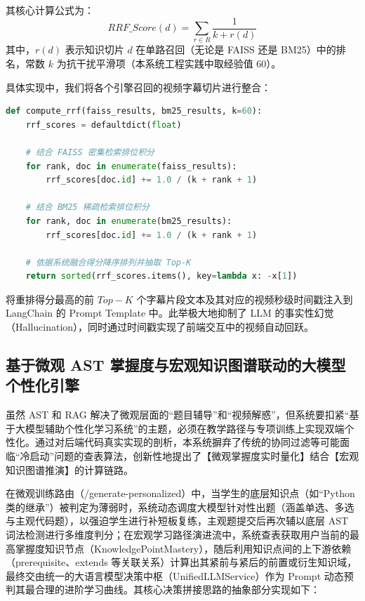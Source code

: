 其核心计算公式为：
\begin{equation}
RRF\_Score(d) = \sum_{r \in R} \frac{1}{k + r(d)}
\end{equation}
其中，$r(d)$ 表示知识切片 $d$ 在单路召回（无论是 FAISS 还是 BM25）中的排名，常数 $k$ 为抗干扰平滑项（本系统工程实践中取经验值 60）。

具体实现中，我们将各个引擎召回的视频字幕切片进行整合：
\begin{lstlisting}[language=Python, caption=双路混合 RRF 重排融合算法核心实现]
def compute_rrf(faiss_results, bm25_results, k=60):
    rrf_scores = defaultdict(float)
    
    # 结合 FAISS 密集检索排位积分
    for rank, doc in enumerate(faiss_results):
        rrf_scores[doc.id] += 1.0 / (k + rank + 1)
        
    # 结合 BM25 稀疏检索排位积分
    for rank, doc in enumerate(bm25_results):
        rrf_scores[doc.id] += 1.0 / (k + rank + 1)
        
    # 依据系统融合得分降序排列并抽取 Top-K
    return sorted(rrf_scores.items(), key=lambda x: -x[1])
\end{lstlisting}
将重排得分最高的前 $Top-K$ 个字幕片段文本及其对应的视频秒级时间戳注入到 LangChain 的 Prompt Template 中。此举极大地抑制了 LLM 的事实性幻觉（Hallucination），同时通过时间戳实现了前端交互中的视频自动回跃。


\subsection{基于微观 AST 掌握度与宏观知识图谱联动的大模型个性化引擎}

虽然 AST 和 RAG 解决了微观层面的“题目辅导”和“视频解惑”，但系统要扣紧“基于大模型辅助个性化学习系统”的主题，必须在教学路径与专项训练上实现双端个性化。通过对后端代码真实实现的剖析，本系统摒弃了传统的协同过滤等可能面临“冷启动”问题的查表算法，创新性地提出了【微观掌握度实时量化】结合【宏观知识图谱推演】的计算链路。

在微观训练路由（/generate-personalized）中，当学生的底层知识点（如“Python类的继承”）被判定为薄弱时，系统动态调度大模型针对性出题（涵盖单选、多选与主观代码题），以强迫学生进行补短板复练，主观题提交后再次辅以底层 AST 词法检测进行多维度判分；在宏观学习路径演进流中，系统查表获取用户当前的最高掌握度知识节点（KnowledgePointMastery），随后利用知识点间的上下游依赖（prerequisite、extends 等关联关系）计算出其紧前与紧后的前置或衍生知识域，最终交由统一的大语言模型决策中枢（UnifiedLLMService）作为 Prompt 动态预判其最合理的进阶学习曲线。其核心决策拼接思路的抽象部分实现如下：

